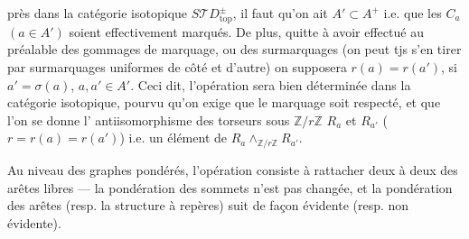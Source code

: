 
près dans la catégorie isotopique $S\mathcal TD_{\mathrm{top}}^\pm$, il faut
 qu'on ait $A'\subset A^+$ i.e. que les $C_a$ $(a\in A')$ soient effectivement marqués.
De plus, quitte à avoir effectué au préalable des gommages de marquage, ou des surmarquages (on peut tjs s'en tirer par surmarquages uniformes de côté et d'autre) on supposera $r(a)=r(a')$, si $a'=\sigma(a)$, $a,a'\in A'$.
Ceci dit, l'opération sera bien déterminée dans la catégorie isotopique, pourvu qu'on  exige que le marquage soit respecté, et que l'on se donne l' antiisomorphisme des torseurs sous $\mathbb Z/r\mathbb Z$ $R_a$ et $R_{a'}$ ($r=r(a)=r(a')$) i.e. un élément de
$R_a\mathbin{\wedge}_{\mathbb Z/r\mathbb Z}R_{a'}$.

Au niveau des graphes pondérés, l'opération consiste à rattacher deux à deux  des arêtes libres --- la pondération des sommets n'est pas changée, et la pondération des arêtes (resp. la structure à repères) suit de façon  évidente (resp. non évidente).
